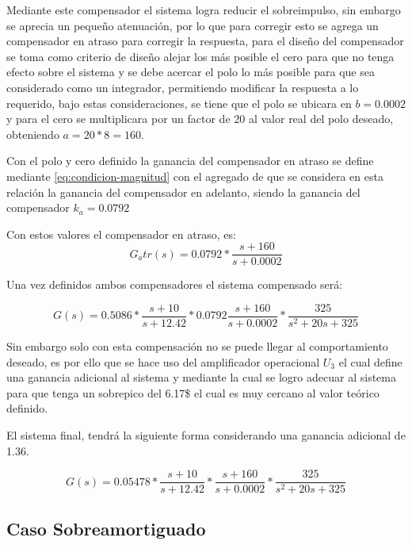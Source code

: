 \documentclass[conference]{IEEEtran}
\begin{document}
	Mediante este compensador el sistema logra reducir el sobreimpulso, sin embargo se aprecia un pequeño atenuación, por lo que para corregir esto se agrega un compensador en atraso para corregir la respuesta, para el diseño del compensador se toma como criterio de diseño alejar los más posible el cero para que no tenga efecto sobre el sistema y se debe acercar el polo lo más posible para que sea considerado como un integrador, permitiendo modificar la respuesta a lo requerido, bajo estas consideraciones, se tiene que el polo se ubicara en $b = 0.0002$ y para el cero se multiplicara por un factor de 20 al valor real del polo deseado, obteniendo $a = 20*8 = 160$.
	
	Con el polo y cero definido la ganancia del compensador en atraso se define mediante \ref{eq:condicion-magnitud} con el agregado de que se considera en esta relación la ganancia del compensador en adelanto, siendo la ganancia del compensador $k_a = 0.0792$
	
	
	Con estos valores el compensador en atraso, es:
	\begin{equation}
		G_atr(s) = 0.0792*\frac{s + 160}{s + 0.0002}
		\label{eq:compensador-atraso-sub}
	\end{equation}
	
	Una vez definidos ambos compensadores el sistema compensado será:
	
	\begin{equation}
		G(s) = 0.5086*\frac{s + 10}{s + 12.42} *0.0792\frac{s + 160}{s + 0.0002}*\frac{325}{s^2 + 20s + 325}
		\label{eq:sistema-sub-compensado}	
	\end{equation}
	
	Sin embargo solo con esta compensación no se puede llegar al comportamiento deseado, es por ello que se hace uso del amplificador operacional $U_3$ el cual define una ganancia adicional al sistema y mediante la cual se logro adecuar al sistema para que tenga un sobrepico del 6.17\$ el cual es muy cercano al valor teórico definido.
	
	El sistema final, tendrá la siguiente forma considerando una ganancia adicional de 1.36.
	
	\begin{equation}
		G(s) = 0.05478*\frac{s + 10}{s + 12.42}*\frac{s + 160}{s + 0.0002}*\frac{325}{s^2 + 20s + 325}
		\label{eq:sistema-sub-compensado-final}	
	\end{equation}
	
	\subsection{\textbf{Caso Sobreamortiguado}}
	
\end{document}
